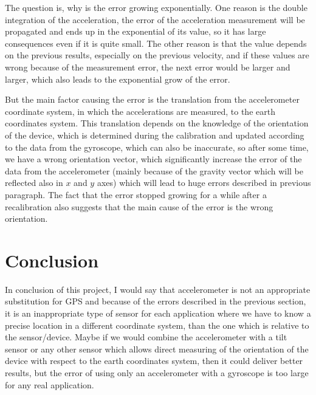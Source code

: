 \documentclass[hidelinks,a4paper]{article}
\begin{document}
The question is, why is the error growing exponentially. One reason is the double integration of the acceleration, the error of the acceleration measurement will be propagated\cite{UNCERNITY} and ends up in the exponential of its value, so it has large consequences even if it is quite small. The other reason is that the value depends on the previous results, especially on the previous velocity, and if these values are wrong because of the measurement error, the next error would be larger and larger, which also leads to the exponential grow of the error.\par
But the main factor causing the error is the translation from the accelerometer coordinate system, in which the accelerations are measured, to the earth coordinates system. This translation depends on the knowledge of the orientation of the device, which is determined during the calibration and updated according to the data from the gyroscope, which can also be inaccurate, so after some time, we have a wrong orientation vector, which significantly increase the error of the data from the accelerometer (mainly because of the gravity vector which will be reflected also in $x$ and $y$ axes) which will lead to huge errors described in previous paragraph. The fact that the error stopped growing for a while after a recalibration also suggests that the main cause of the error is the wrong orientation.

\section{Conclusion}
In conclusion of this project, I would say that accelerometer is not an appropriate substitution for GPS and because of the errors described in the previous section, it is an inappropriate type of sensor for each application where we have to know a precise location in a different coordinate system, than the one which is relative to the sensor/device. Maybe if we would combine the accelerometer with a tilt sensor or any other sensor which allows direct measuring of the orientation of the device with respect to the earth coordinates system, then it could deliver better results, but the error of using only an accelerometer with a gyroscope is too large for any real application.\par

\clearpage
{}
\nocite{ACCGyro}
\nocite{BoardGH}
\nocite{NMEA}
\nocite{GYRO}
\printbibliography
\end{document}
